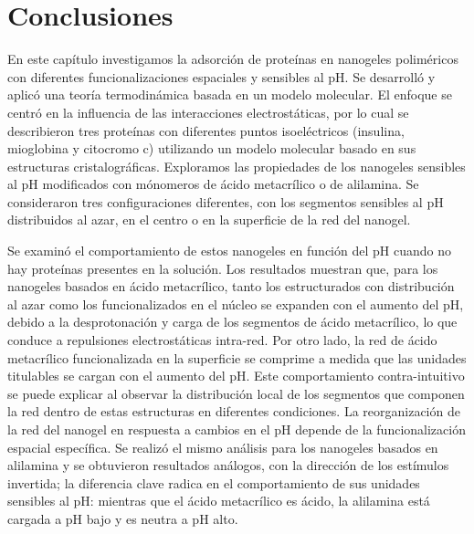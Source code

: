 \section{Conclusiones}


En este cap\'itulo investigamos la adsorci\'on de prote\'inas en nanogeles polim\'ericos con diferentes funcionalizaciones espaciales y sensibles al pH. Se desarroll\'o y aplic\'o una teor\'ia termodin\'amica basada en un modelo molecular.
El enfoque se centr\'o en la influencia de las interacciones electrost\'aticas, por lo cual se describieron tres prote\'inas con diferentes puntos isoel\'ectricos (insulina, mioglobina y citocromo c) utilizando un modelo molecular basado en sus estructuras cristalogr\'aficas.
Exploramos las propiedades de los nanogeles sensibles al pH modificados con m\'onomeros de  \'acido metacr\'ilico o de alilamina.
Se consideraron tres configuraciones diferentes, con los segmentos sensibles al pH distribuidos al azar, en el centro o en la superficie de la red del nanogel.

Se examin\'o el comportamiento de estos nanogeles en funci\'on del pH cuando no hay prote\'inas presentes en la soluci\'on.
Los resultados muestran que, para los nanogeles basados en \'acido metacr\'ilico, tanto los estructurados con distribuci\'on al azar como los funcionalizados en el n\'ucleo se expanden con el aumento del pH, debido a la desprotonaci\'on y carga de los segmentos de \'acido metacr\'ilico, lo que conduce a repulsiones electrost\'aticas intra-red.
Por otro lado, la red de \'acido metacr\'ilico funcionalizada en la superficie se comprime a medida que las unidades titulables se cargan con el aumento del pH.
Este comportamiento contra-intuitivo se puede explicar al observar la distribuci\'on local de los segmentos que componen la red dentro de estas estructuras en diferentes condiciones.
La reorganizaci\'on de la red del nanogel en respuesta a cambios en el pH depende de la funcionalizaci\'on espacial espec\'ifica.
Se realiz\'o el mismo an\'alisis para los nanogeles basados en alilamina y se obtuvieron resultados an\'alogos, con la direcci\'on de los est\'imulos invertida;
la diferencia clave radica en el comportamiento de sus unidades sensibles al pH: mientras que el \'acido metacr\'ilico es \'acido, la alilamina est\'a cargada a pH bajo y es neutra a pH alto.


